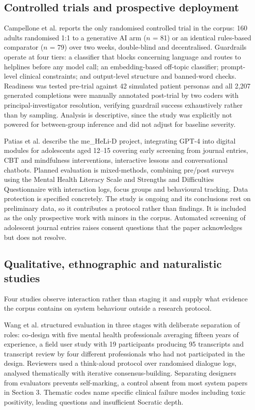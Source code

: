 \documentclass[11pt]{article}
\begin{document}
	\subsection{Controlled trials and prospective deployment}
	
	Campellone et al.\cite{info:doi/10.2196/67365} reports the only randomised controlled trial in the corpus: 160 adults randomised 1:1 to a generative AI arm ($n$ = 81) or an identical rules-based comparator ($n$ = 79) over two weeks, double-blind and decentralised. Guardrails operate at four tiers: a classifier that blocks concerning language and routes to helplines before any model call; an embedding-based off-topic classifier; prompt-level clinical constraints; and output-level structure and banned-word checks. Readiness was tested pre-trial against 42 simulated patient personas and all 2,207 generated completions were manually annotated post-trial by two coders with principal-investigator resolution, verifying guardrail success exhaustively rather than by sampling. Analysis is descriptive, since the study was explicitly not powered for between-group inference and did not adjust for baseline severity.
	
	Patias et al.\cite{10845582} describe the me\_HeLi-D project, integrating GPT-4 into digital modules for adolescents aged 12--15 covering early screening from journal entries, CBT and mindfulness interventions, interactive lessons and conversational chatbots. Planned evaluation is mixed-methods, combining pre/post surveys using the Mental Health Literacy Scale and Strengths and Difficulties Questionnaire with interaction logs, focus groups and behavioural tracking. Data protection is specified concretely. The study is ongoing and its conclusions rest on preliminary data, so it contributes a protocol rather than findings. It is included as the only prospective work with minors in the corpus. Automated screening of adolescent journal entries raises consent questions that the paper acknowledges but does not resolve.
	
	\subsection{Qualitative, ethnographic and naturalistic studies}
	
	Four studies observe interaction rather than staging it and supply what evidence the corpus contains on system behaviour outside a research protocol.
	
	Wang et al.\cite{wang2025evaluatingllmpoweredchatbotcognitive} structured evaluation in three stages with deliberate separation of roles: co-design with five mental health professionals averaging fifteen years of experience, a field user study with 19 participants producing 95 transcripts and transcript review by four different professionals who had not participated in the design. Reviewers used a think-aloud protocol over randomised dialogue logs, analysed thematically with iterative consensus-building. Separating designers from evaluators prevents self-marking, a control absent from most system papers in Section 3. Thematic codes name specific clinical failure modes including toxic positivity, leading questions and insufficient Socratic depth.
	
\end{document}
